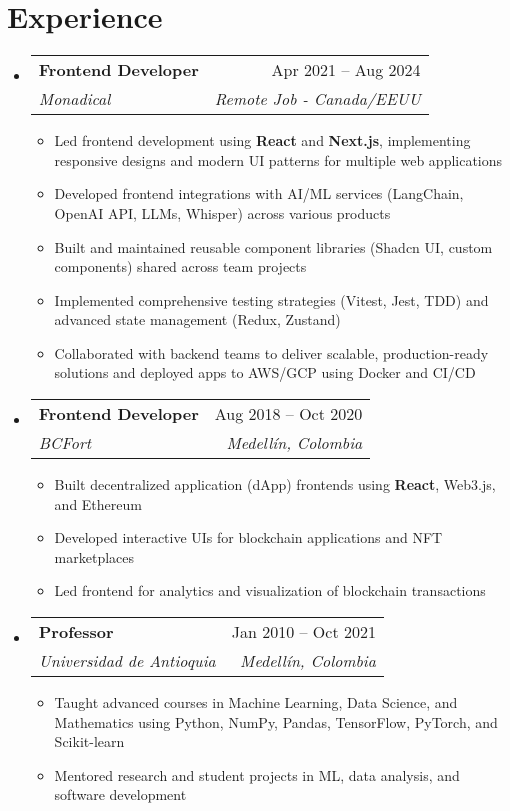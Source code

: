 \documentclass[letterpaper,11pt]{article}
\makeatletter
\newcommand{\resumeSubheading}[4]{
  \vspace{-2pt}
  \item[]
  \begin{tabular*}{\textwidth}{@{\extracolsep{\fill}}l r}
    \textbf{#1} & #2 \\
    \textit{#3} & \textit{#4} \\
  \end{tabular*}
  \vspace{-5pt}
}
\makeatother
\begin{document}
\section{Experience}
\begin{itemize}[leftmargin=0pt, itemindent=0pt, label={}]
\resumeSubheading
{Frontend Developer}{Apr 2021 -- Aug 2024}
{Monadical}{Remote Job - Canada/EEUU}
\begin{itemize}[leftmargin=*]
\item Led frontend development using \textbf{React} and \textbf{Next.js}, implementing responsive designs and modern UI patterns for multiple web applications
\item Developed frontend integrations with AI/ML services (LangChain, OpenAI API, LLMs, Whisper) across various products
\item Built and maintained reusable component libraries (Shadcn UI, custom components) shared across team projects
\item Implemented comprehensive testing strategies (Vitest, Jest, TDD) and advanced state management (Redux, Zustand)
\item Collaborated with backend teams to deliver scalable, production-ready solutions and deployed apps to AWS/GCP using Docker and CI/CD
\end{itemize}

\resumeSubheading
{Frontend Developer}{Aug 2018 -- Oct 2020}
{BCFort}{Medellín, Colombia}
\begin{itemize}[leftmargin=*]
    \item Built decentralized application (dApp) frontends using \textbf{React}, Web3.js, and Ethereum
    \item Developed interactive UIs for blockchain applications and NFT marketplaces
    \item Led frontend for analytics and visualization of blockchain transactions
\end{itemize}

\resumeSubheading
{Professor}{Jan 2010 -- Oct 2021}
{Universidad de Antioquia}{Medellín, Colombia}
\begin{itemize}[leftmargin=*]
    \item Taught advanced courses in Machine Learning, Data Science, and Mathematics using Python, NumPy, Pandas, TensorFlow, PyTorch, and Scikit-learn
    \item Mentored research and student projects in ML, data analysis, and software development
\end{itemize}
\end{itemize}
\end{document}

